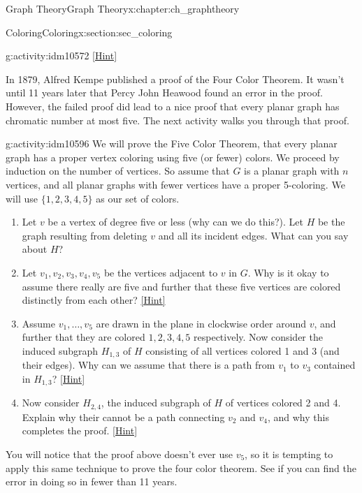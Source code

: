 \documentclass[oneside,10pt,]{book}
\numberwithin{equation}{chapter}
\begin{document}
\begin{chapterptx}{Graph Theory}{}{Graph Theory}{}{}{x:chapter:ch_graphtheory}
\begin{sectionptx}{Coloring}{}{Coloring}{}{}{x:section:sec_coloring}
\begin{introduction}{}
\begin{activity}{}{g:activity:idm10572}
\space\hspace*{0pt}\hfill{\tiny\hyperlink{g:hint:idm10575-back}{[Hint]}}\end{activity}
In 1879, Alfred Kempe published a proof of the Four Color Theorem.  It wasn't until 11 years later that Percy John Heawood found an error in the proof.  However, the failed proof did lead to a nice proof that every planar graph has chromatic number at most five.  The next activity walks you through that proof.%
\begin{activity}{}{g:activity:idm10596}%
We will prove the Five Color Theorem, that every planar graph has a proper vertex coloring using five (or fewer) colors.  We proceed by induction on the number of vertices.  So assume that \(G\) is a planar graph with \(n\) vertices, and all planar graphs with fewer vertices have a proper 5-coloring.  We will use \(\{1,2,3,4,5\}\) as our set of colors.%
\begin{enumerate}[font=\bfseries,label=(\alph*),ref=\alph*]
\item{}Let \(v\) be a vertex of degree five or less (why can we do this?).  Let \(H\) be the graph resulting from deleting \(v\) and all its incident edges.  What can you say about \(H\)?%
\item{}Let \(v_1, v_2, v_3, v_4, v_5\) be the vertices adjacent to \(v\) in \(G\).  Why is it okay to assume there really are five and further that these five vertices are colored distinctly from each other?%
\space\hspace*{0pt}\hfill{\tiny\hyperlink{g:hint:idm10615-back}{[Hint]}}\item{}Assume \(v_1, \ldots, v_5\) are drawn in the plane in clockwise order around \(v\), and further that they are colored \(1,2,3,4,5\) respectively.  Now consider the induced subgraph \(H_{1,3}\) of \(H\) consisting of all vertices colored 1 and 3 (and their edges).  Why can we assume that there is a path from \(v_1\) to \(v_3\) contained in \(H_{1,3}\)?%
\space\hspace*{0pt}\hfill{\tiny\hyperlink{g:hint:idm10629-back}{[Hint]}}\item{}Now consider \(H_{2,4}\), the induced subgraph of \(H\) of vertices colored 2 and 4.  Explain why their cannot be a path connecting \(v_2\) and \(v_4\), and why this completes the proof.%
\space\hspace*{0pt}\hfill{\tiny\hyperlink{g:hint:idm10641-back}{[Hint]}}\end{enumerate}
\end{activity}
You will notice that the proof above doesn't ever use \(v_5\), so it is tempting to apply this same technique to prove the four color theorem.  See if you can find the error in doing so in fewer than 11 years.%

\end{introduction}
\end{sectionptx}
\end{chapterptx}
\end{document}

